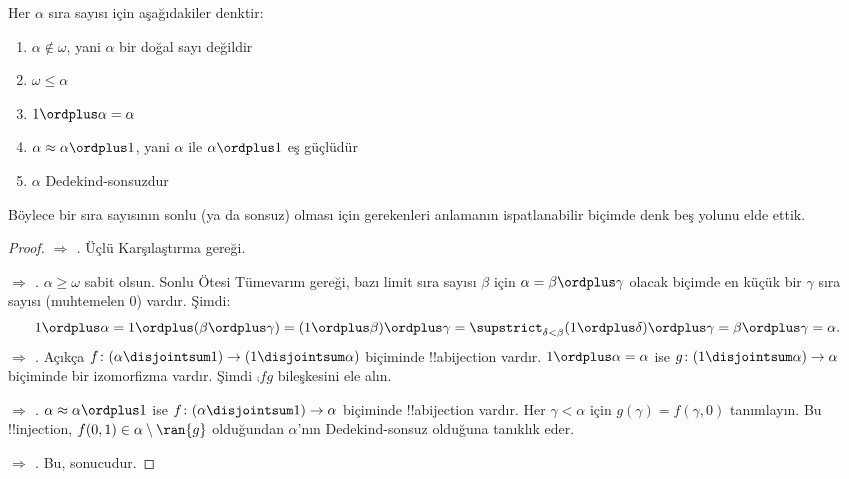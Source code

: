 \begin{lem}
Her $\alpha$ sıra sayısı için aşağıdakiler denktir:
\begin{enumerate}
	\item{} $\alpha\notin\omega$, yani $\alpha$ bir
	doğal sayı değildir
	\item{} $\omega\leq\alpha$
	\item{} $1\ordplus\alpha=\alpha$
	\item{} $\alpha\approx\alpha\ordplus 1$, yani
	$\alpha$ ile $\alpha\ordplus 1$ eş güçlüdür
	\item{} $\alpha$ Dedekind-sonsuzdur
	\end{enumerate}
\end{lem}
\noindent
Böylece bir sıra sayısının sonlu (ya da sonsuz) olması için gerekenleri
anlamanın ispatlanabilir biçimde denk beş yolunu elde ettik.

\begin{proof}
\emph{ $\Rightarrow$ .}
Üçlü Karşılaştırma gereği.

\emph{ $\Rightarrow$ .}
$\alpha\geq\omega$ sabit olsun. Sonlu Ötesi Tümevarım gereği, bazı limit
sıra sayısı $\beta$ için $\alpha=\beta\ordplus\gamma$ olacak biçimde en
küçük bir $\gamma$ sıra sayısı (muhtemelen $0$) vardır. Şimdi:
\[
	1 \ordplus \alpha =  
	1 \ordplus (\beta \ordplus \gamma) = 
	(1 \ordplus \beta) \ordplus \gamma =  
	\supstrict_{\delta < \beta} (1 \ordplus  \delta) \ordplus  \gamma = 
	\beta \ordplus  \gamma = 
	\alpha.
\]
\emph{ $\Rightarrow$ .}
Açıkça $f\colon(\alpha\disjointsum 1)\to(1\disjointsum\alpha)$ biçiminde
!!a{bijection} vardır. $1\ordplus\alpha=\alpha$ ise
$g\colon(1\disjointsum\alpha)\to\alpha$ biçiminde bir izomorfizma vardır.
Şimdi $\comp{f}{g}$ bileşkesini ele alın.

\emph{ $\Rightarrow$ .}
$\alpha\approx\alpha\ordplus 1$ ise
$f\colon(\alpha\disjointsum 1)\to\alpha$ biçiminde !!a{bijection} vardır.
Her $\gamma<\alpha$ için $g(\gamma)=f(\gamma,0)$ tanımlayın. Bu
!!{injection}, $f(0,1)\in\alpha\setminus\ran{g}$ olduğundan $\alpha$'nın
Dedekind-sonsuz olduğuna tanıklık eder.

\emph{ $\Rightarrow$ .}
Bu,  sonucudur.
\end{proof}

